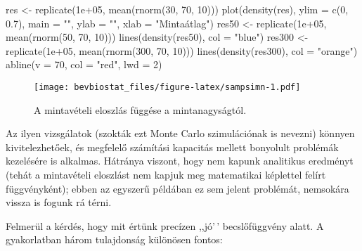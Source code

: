 \documentclass[
]{book}
\newenvironment{Shaded}{\begin{snugshade}}{\end{snugshade}}
\newcommand{\AttributeTok}[1]{\textcolor[rgb]{0.77,0.63,0.00}{#1}}
\newcommand{\DecValTok}[1]{\textcolor[rgb]{0.00,0.00,0.81}{#1}}
\newcommand{\FloatTok}[1]{\textcolor[rgb]{0.00,0.00,0.81}{#1}}
\newcommand{\FunctionTok}[1]{\textcolor[rgb]{0.00,0.00,0.00}{#1}}
\newcommand{\NormalTok}[1]{#1}
\newcommand{\OtherTok}[1]{\textcolor[rgb]{0.56,0.35,0.01}{#1}}
\newcommand{\StringTok}[1]{\textcolor[rgb]{0.31,0.60,0.02}{#1}}
\begin{document}
\begin{Shaded}
\begin{Highlighting}[]
\NormalTok{res }\OtherTok{\textless{}{-}} \FunctionTok{replicate}\NormalTok{(}\FloatTok{1e+05}\NormalTok{, }\FunctionTok{mean}\NormalTok{(}\FunctionTok{rnorm}\NormalTok{(}\DecValTok{30}\NormalTok{, }\DecValTok{70}\NormalTok{, }\DecValTok{10}\NormalTok{)))}
\FunctionTok{plot}\NormalTok{(}\FunctionTok{density}\NormalTok{(res), }\AttributeTok{ylim =} \FunctionTok{c}\NormalTok{(}\DecValTok{0}\NormalTok{, }\FloatTok{0.7}\NormalTok{), }\AttributeTok{main =} \StringTok{""}\NormalTok{, }\AttributeTok{ylab =} \StringTok{""}\NormalTok{, }\AttributeTok{xlab =} \StringTok{"Mintaátlag"}\NormalTok{)}
\NormalTok{res50 }\OtherTok{\textless{}{-}} \FunctionTok{replicate}\NormalTok{(}\FloatTok{1e+05}\NormalTok{, }\FunctionTok{mean}\NormalTok{(}\FunctionTok{rnorm}\NormalTok{(}\DecValTok{50}\NormalTok{, }\DecValTok{70}\NormalTok{, }\DecValTok{10}\NormalTok{)))}
\FunctionTok{lines}\NormalTok{(}\FunctionTok{density}\NormalTok{(res50), }\AttributeTok{col =} \StringTok{"blue"}\NormalTok{)}
\NormalTok{res300 }\OtherTok{\textless{}{-}} \FunctionTok{replicate}\NormalTok{(}\FloatTok{1e+05}\NormalTok{, }\FunctionTok{mean}\NormalTok{(}\FunctionTok{rnorm}\NormalTok{(}\DecValTok{300}\NormalTok{, }\DecValTok{70}\NormalTok{, }\DecValTok{10}\NormalTok{)))}
\FunctionTok{lines}\NormalTok{(}\FunctionTok{density}\NormalTok{(res300), }\AttributeTok{col =} \StringTok{"orange"}\NormalTok{)}
\FunctionTok{abline}\NormalTok{(}\AttributeTok{v =} \DecValTok{70}\NormalTok{, }\AttributeTok{col =} \StringTok{"red"}\NormalTok{, }\AttributeTok{lwd =} \DecValTok{2}\NormalTok{)}
\end{Highlighting}
\end{Shaded}

\begin{figure}
\centering
\texttt{[image: bevbiostat\_files/figure-latex/sampsimn-1.pdf]}
\caption{\label{fig:sampsimn}A mintavételi eloszlás függése a mintanagyságtól.}
\end{figure}

Az ilyen vizsgálatok (szokták ezt Monte Carlo szimulációnak is nevezni) könnyen kivitelezhetőek, és megfelelő számítási kapacitás mellett bonyolult problémák kezelésére is alkalmas. Hátránya viszont, hogy nem kapunk analitikus eredményt (tehát a mintavételi eloszlást nem kapjuk meg matematikai képlettel felírt függvényként); ebben az egyszerű példában ez sem jelent problémát, nemsokára vissza is fogunk rá térni.

Felmerül a kérdés, hogy mit értünk precízen ,,jó'\,' becslőfüggvény alatt. A gyakorlatban három tulajdonság különösen fontos:
\end{document}
